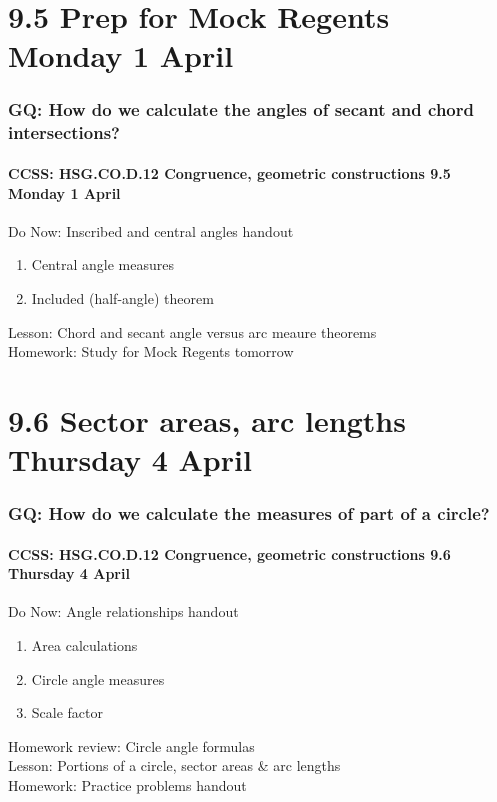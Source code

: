 \documentclass{beamer}
\begin{document}
\section{9.5 Prep for Mock Regents Monday 1 April}
\frame
{
  \frametitle{GQ: How do we calculate the angles of secant and chord intersections?}
  \framesubtitle{CCSS: HSG.CO.D.12 Congruence, geometric constructions \hfill \alert{9.5 Monday 1 April}}

    \begin{block}{Do Now: Inscribed and central angles handout}
      \begin{enumerate}
        \item Central angle measures
        \item Included (half-angle) theorem
      \end{enumerate}
    \end{block}
  Lesson: Chord and secant angle versus arc meaure theorems\\
  Homework: Study for \alert{Mock Regents tomorrow}
}

\section{9.6 Sector areas, arc lengths Thursday 4 April}
  \frame
  {
    \frametitle{GQ: How do we calculate the measures of part of a circle?}
    \framesubtitle{CCSS: HSG.CO.D.12 Congruence, geometric constructions \hfill \alert{9.6 Thursday 4 April}}

    \begin{block}{Do Now: Angle relationships handout}
      \begin{enumerate}
        \item Area calculations
        \item Circle angle measures
        \item Scale factor
      \end{enumerate}
    \end{block}
    Homework review: Circle angle formulas\\
    Lesson: Portions of a circle, sector areas \& arc lengths\\[0.5cm]
    Homework: Practice problems handout
  }
\end{document}
